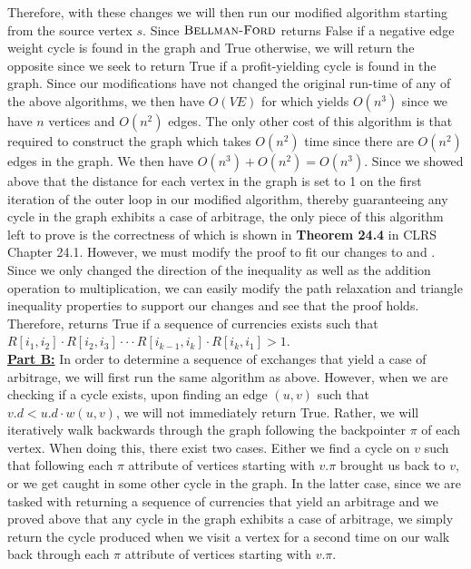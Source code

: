 \documentclass[11pt]{article}
\begin{document}
Therefore, with these changes we will then run our modified  algorithm starting from the source vertex $s$. Since $\textnormal{\scshape Bellman-Ford}$ returns False if a negative edge weight cycle is found in the graph and True otherwise, we will return the opposite since we seek to return True if a profit-yielding cycle is found in the graph. Since our modifications have not changed the original run-time of any of the above algorithms, we then have $O(VE)$ for  which yields $O(n^3)$ since we have $n$ vertices and $O(n^2)$ edges. The only other cost of this algorithm is that required to construct the graph which takes $O(n^2)$ time since there are $O(n^2)$ edges in the graph. We then have $O(n^3) + O(n^2) = O(n^3)$. Since we showed above that the distance for each vertex in the graph is set to 1 on the first iteration of the outer loop in our modified algorithm, thereby guaranteeing any cycle in the graph exhibits a case of arbitrage, the only piece of this algorithm left to prove is the correctness of  which is shown in \textbf{Theorem 24.4} in CLRS Chapter 24.1. However, we must modify the proof to fit our changes to  and . Since we only changed the direction of the inequality as well as the addition operation to multiplication, we can easily modify the path relaxation and triangle inequality properties to support our changes and see that the proof holds. Therefore,  returns True if a sequence of currencies exists such that $R[i_1,i_2] \cdot R[i_2,i_3] \cdot \cdot \cdot R[i_{k-1},i_k] \cdot R[i_k,i_1] > 1$.\\

\textbf{\underline{Part B:}} In order to determine a sequence of exchanges that yield a case of arbitrage, we will first run the same algorithm as above. However, when we are checking if a cycle exists, upon finding an edge $(u,v)$ such that $v.d < u.d \cdot w(u,v)$, we will not immediately return True. Rather, we will iteratively walk backwards through the graph following the backpointer $\pi$ of each vertex. When doing this, there exist two cases. Either we find a cycle on $v$ such that following each $\pi$ attribute of vertices starting with $v.\pi$ brought us back to $v$, or we get caught in some other cycle in the graph. In the latter case, since we are tasked with returning a sequence of currencies that yield an arbitrage and we proved above that any cycle in the graph exhibits a case of arbitrage, we simply return the cycle produced when we visit a vertex for a second time on our walk back through each $\pi$ attribute of vertices starting with $v.\pi$.
\end{document}
